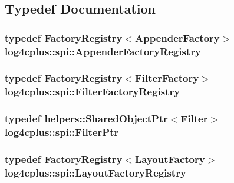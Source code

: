 \subsection{Typedef Documentation}
\hypertarget{namespacelog4cplus_1_1spi_aaec7122d9afe7d4e06cd100cc62418f7}{
\subsubsection[{Appender\-Factory\-Registry}]{\setlength{\rightskip}{0pt plus 5cm}typedef {\bf Factory\-Registry}$<${\bf Appender\-Factory}$>$ {\bf log4cplus\-::spi\-::\-Appender\-Factory\-Registry}}}\label{namespacelog4cplus_1_1spi_aaec7122d9afe7d4e06cd100cc62418f7}
\hypertarget{namespacelog4cplus_1_1spi_a201100cf253db6d2160f88b20bbf7d9d}{
\subsubsection[{Filter\-Factory\-Registry}]{\setlength{\rightskip}{0pt plus 5cm}typedef {\bf Factory\-Registry}$<${\bf Filter\-Factory}$>$ {\bf log4cplus\-::spi\-::\-Filter\-Factory\-Registry}}}\label{namespacelog4cplus_1_1spi_a201100cf253db6d2160f88b20bbf7d9d}
\hypertarget{namespacelog4cplus_1_1spi_abfdea757523ce8fe4598502a29bc7545}{
\subsubsection[{Filter\-Ptr}]{\setlength{\rightskip}{0pt plus 5cm}typedef {\bf helpers\-::\-Shared\-Object\-Ptr}$<${\bf Filter}$>$ {\bf log4cplus\-::spi\-::\-Filter\-Ptr}}}\label{namespacelog4cplus_1_1spi_abfdea757523ce8fe4598502a29bc7545}
\hypertarget{namespacelog4cplus_1_1spi_afcec0afcb2d25a187db1e85feb2d0796}{
\subsubsection[{Layout\-Factory\-Registry}]{\setlength{\rightskip}{0pt plus 5cm}typedef {\bf Factory\-Registry}$<${\bf Layout\-Factory}$>$ {\bf log4cplus\-::spi\-::\-Layout\-Factory\-Registry}}}\label{namespacelog4cplus_1_1spi_afcec0afcb2d25a187db1e85feb2d0796}
